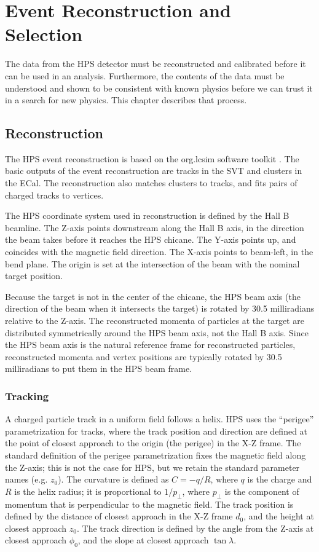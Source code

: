 \chapter{Event Reconstruction and Selection}
The data from the HPS detector must be reconstructed and calibrated before it can be used in an analysis.
Furthermore, the contents of the data must be understood and shown to be consistent with known physics before we can trust it in a search for new physics.
This chapter describes that process.

\section{Reconstruction}
The HPS event reconstruction is based on the org.lcsim software toolkit \cite{graf_org.lcsim:_2011}.
The basic outputs of the event reconstruction are tracks in the SVT and clusters in the ECal.
The reconstruction also matches clusters to tracks, and fits pairs of charged tracks to vertices.

The HPS coordinate system used in reconstruction is defined by the Hall B beamline.
The Z-axis points downstream along the Hall B axis, in the direction the beam takes before it reaches the HPS chicane.
The Y-axis points up, and coincides with the magnetic field direction.
The X-axis points to beam-left, in the bend plane.
The origin is set at the intersection of the beam with the nominal target position.

Because the target is not in the center of the chicane, the HPS beam axis (the direction of the beam when it intersects the target) is rotated by 30.5 milliradians relative to the Z-axis.
The reconstructed momenta of particles at the target are distributed symmetrically around the HPS beam axis, not the Hall B axis.
Since the HPS beam axis is the natural reference frame for reconstructed particles, reconstructed momenta and vertex positions are typically rotated by 30.5 milliradians to put them in the HPS beam frame.

\subsection{Tracking}
\label{sec:track_recon}
A charged particle track in a uniform field follows a helix.
HPS uses the ``perigee'' parametrization for tracks, where the track position and direction are defined at the point of closest approach to the origin (the perigee) in the X-Z frame.
The standard definition of the perigee parametrization fixes the magnetic field along the Z-axis; this is not the case for HPS, but we retain the standard parameter names (e.g. $z_0$).
The curvature is defined as $C=-q/R$, where $q$ is the charge and $R$ is the helix radius; it is proportional to $1/p_\perp$, where $p_\perp$ is the component of momentum that is perpendicular to the magnetic field.
The track position is defined by the distance of closest approach in the X-Z frame $d_0$, and the height at closest approach $z_0$.
The track direction is defined by the angle from the Z-axis at closest approach $\phi_0$, and the slope at closest approach $\tan\lambda$.

